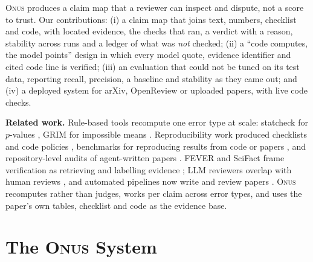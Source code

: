 \documentclass[10pt,twocolumn,twoside,letterpaper]{article}
\newcommand{\onus}{\textsc{Onus}}
\begin{document}
\onus{} produces a claim map that a reviewer can inspect and dispute, not a score to trust. Our
contributions: (i) a claim map that joins text, numbers, checklist and code, with located evidence, the
checks that ran, a verdict with a reason, stability across runs and a ledger of what was \emph{not} checked;
(ii) a ``code computes, the model points'' design in which every model quote, evidence identifier and cited
code line is verified; (iii) an evaluation that could not be tuned on its test data, reporting recall,
precision, a baseline and stability as they came out; and (iv) a deployed system for arXiv, OpenReview or
uploaded papers, with live code checks.

\textbf{Related work.} Rule-based tools recompute one error type at scale: statcheck for $p$-values
\citep{nuijten2016prevalence}, GRIM for impossible means \citep{brown2017grim}. Reproducibility work produced
checklists and code policies \citep{pineau2021improving}, benchmarks for reproducing results from code or
papers \citep{siegel2024corebench,starace2025paperbench}, and repository-level audits of agent-written papers
\citep{shen2026beyond}. FEVER and SciFact frame verification as retrieving and labelling evidence
\citep{thorne2018fever,wadden2020fact}; LLM reviewers overlap with human reviews \citep{liang2024can}, and
automated pipelines now write and review papers \citep{lu2024aiscientist}. \onus{} recomputes rather than
judges, works per claim across error types, and uses the paper's own tables, checklist and code as the
evidence base.

\section{The \onus{} System}
\label{sec:system}
\end{document}
